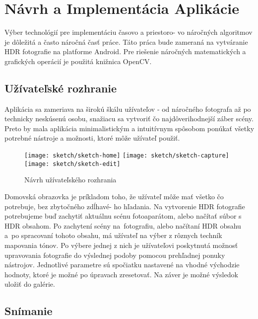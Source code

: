 \documentclass[slovak]{ExcelAtFIT}
\begin{document}
\section{Návrh a Implementácia Aplikácie}
\label{sec:Implement}

Výber technológií pre implementáciu časovo a priestoro- vo náročných algoritmov je dôležitá a často 
náročná časť práce. Táto práca bude zameraná na vytváranie HDR fotografie na platforme Android.
Pre riešenie náročných matematických a grafických operácií je použitá knižnica OpenCV.

\subsection{Užívateľské rozhranie}
\label{sec:Implement-UI}

Aplikácia sa zameriava na širokú škálu užívateľov - od náročného fotografa až po technicky neskúsenú
osobu, snažiacu sa vytvoriť čo najdôverihodnejší záber scény. Preto by mala aplikácia minimalistickým 
a intuitívnym spôsobom ponúkať všetky potrebné nástroje a možnosti, ktoré môže užívateľ použiť.

\begin{figure}[t]
  \centering
	\texttt{[image: sketch/sketch-home]}
	\texttt{[image: sketch/sketch-capture]}
	\texttt{[image: sketch/sketch-edit]}
  \caption{Návrh užívateľského rozhrania}
  \label{fig:SketchScreens}
\end{figure}

Domovská obrazovka je príkladom toho, že užívateľ môže mať všetko čo potrebuje,
bez zbytočného zdĺhavé- ho hľadania. Na vytvorenie HDR fotografie potrebujeme buď zachytiť aktuálnu scénu
fotoaparátom, alebo načítať súbor s HDR obsahom. Po zachytení scény na~fotografiu, alebo načítaní HDR obsahu a~po spracovaní 
tohoto obsahu, má užívateľ na výber z rôznych techník mapovania tónov. Po výbere jednej z nich je
užívateľovi poskytnutá možnosť upravovania fotografie do výslednej podoby 
pomocou prehľadnej ponuky nástrojov. Jednotlivé parametre sú spočiatku nastavené na vhodné východzie 
hodnoty, ktoré je možné po úpravach zresetovať. Na záver je možné výsledok uložiť do galérie.

\subsection{Snímanie}
\label{sec:Implement-Capturing}
\end{document}
